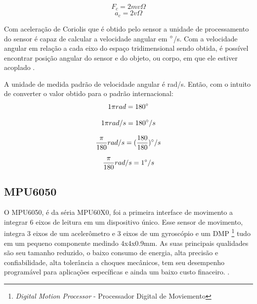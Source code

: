 \begin{equation}
F_{c} = 2mv\Omega
\end{equation}
\begin{equation}
a_{c} = 2v\Omega
\end{equation}

Com aceleração de Coriolis que é obtido pelo sensor a unidade de processamento do sensor é capaz de calcular a velocidade angular em $\degree$/s. Com a velocidade angular em relação a cada eixo do espaço tridimensional sendo obtida, é possível encontrar posição angular do sensor e do objeto, ou corpo, em que ele estiver acoplado \cite{forhan2010}\cite{moyses2013}. 

A unidade de medida padrão de velocidade angular  é rad/s. Então, com o intuito de converter o valor obtido para o padrão internacional:
\begin{equation}
1 \pi rad = 180\degree
\end{equation}

\begin{equation}
1 \pi rad /s = 180\degree/s 
\end{equation}

\begin{equation}
 \frac{\pi}{180} rad /s = (\frac{180}{180})\degree/s 
\end{equation}

\begin{equation}
\frac{\pi}{180} rad /s = 1\degree/s 
\end{equation}


\subsection{MPU6050}
	
	O MPU6050, é da séria MPU60X0, foi a primeira interface de movimento a integrar 6 eixos de leitura em um dispositivo único. Esse sensor de movimento, integra 3 eixos de um acelerômetro e 3 eixos de um gyroscópio e um DMP \footnote{\textit{Digital Motion Processor} - Processador Digital de Moviemento} tudo em um pequeno componente medindo 4x4x0.9mm. As suas principais qualidades são seu tamanho reduzido, o baixo consumo de energia, alta precisão e confiabilidade, alta tolerância a choques mecânicos, tem seu desempenho programável para aplicações específicas e ainda um baixo custo finaceiro. \cite{mpu6050}.
	
